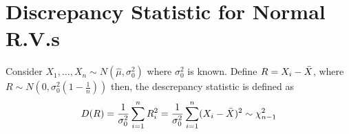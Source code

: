 \documentclass{article}
\begin{document}
\section{Discrepancy Statistic for Normal R.V.s}
Consider $X_1,\ldots,X_n\sim N(\hat{\mu}, \sigma_0^2)$ where $\sigma_0^2$ is known. Define $R = X_i - \Bar{X}$, where $R\sim N(0, \sigma_0^2 (1 - \frac{1}{n}))$ then, the descrepancy statistic is defined as
\begin{equation*}
    D(R) = \frac{1}{\sigma_0^2}\sum_{i = 1}^n R_i^2 =  \frac{1}{\sigma_0^2}\sum_{i=1}^n(X_i - \Bar{X})^2 \sim \chi^2_{n-1}
\end{equation*}
\end{document}
